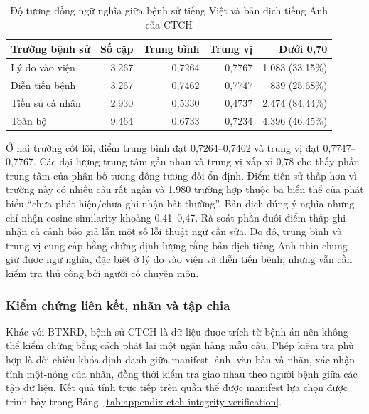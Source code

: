 \begin{table}[H]
\centering
\caption{Độ tương đồng ngữ nghĩa giữa bệnh sử tiếng Việt và bản dịch tiếng Anh của CTCH}
\label{tab:appendix-ctch-translation-similarity}
\small
\begin{tabular}{|L{5.0cm}|r|r|r|r|}
\hline
\textbf{Trường bệnh sử} & \textbf{Số cặp} & \textbf{Trung bình} & \textbf{Trung vị} & \textbf{Dưới 0,70} \\ \hline
Lý do vào viện & 3.267 & 0,7264 & 0,7767 & 1.083 (33,15\%) \\ \hline
Diễn tiến bệnh & 3.267 & 0,7462 & 0,7747 & 839 (25,68\%) \\ \hline
Tiền sử cá nhân & 2.930 & 0,5330 & 0,4737 & 2.474 (84,44\%) \\ \hline
Toàn bộ & 9.464 & 0,6733 & 0,7234 & 4.396 (46,45\%) \\ \hline
\end{tabular}
\end{table}

Ở hai trường cốt lõi, điểm trung bình đạt 0,7264--0,7462 và trung vị đạt 0,7747--0,7767. Các đại lượng trung tâm gần nhau và trung vị xấp xỉ 0,78 cho thấy phần trung tâm của phân bố tương đồng tương đối ổn định. Điểm tiền sử thấp hơn vì trường này có nhiều câu rất ngắn và 1.980 trường hợp thuộc ba biến thể của phát biểu ``chưa phát hiện/chưa ghi nhận bất thường''. Bản dịch đúng ý nghĩa nhưng chỉ nhận cosine similarity khoảng 0,41--0,47. Rà soát phần đuôi điểm thấp ghi nhận cả cảnh báo giả lẫn một số lỗi thuật ngữ cần sửa. Do đó, trung bình và trung vị cung cấp bằng chứng định lượng rằng bản dịch tiếng Anh nhìn chung giữ được ngữ nghĩa, đặc biệt ở lý do vào viện và diễn tiến bệnh, nhưng vẫn cần kiểm tra thủ công bởi người có chuyên môn.

\subsubsection{Kiểm chứng liên kết, nhãn và tập chia}

Khác với BTXRD, bệnh sử CTCH là dữ liệu được trích từ bệnh án nên không thể kiểm chứng bằng cách phát lại một ngân hàng mẫu câu. Phép kiểm tra phù hợp là đối chiếu khóa định danh giữa manifest, ảnh, văn bản và nhãn, xác nhận tính một-nóng của nhãn, đồng thời kiểm tra giao nhau theo người bệnh giữa các tập dữ liệu. Kết quả tính trực tiếp trên quần thể được manifest lựa chọn được trình bày trong Bảng~\ref{tab:appendix-ctch-integrity-verification}.

